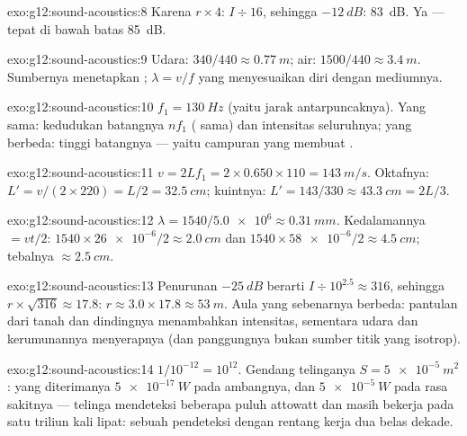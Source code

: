 \begin{solution}{exo:g12:sound-acoustics:8}
Karena $r \times 4$: $I \div 16$, sehingga $-\qty{12}{dB}$:
\qty{83}{dB}. Ya --- tepat di bawah batas \qty{85}{dB}.
\end{solution}

\begin{solution}{exo:g12:sound-acoustics:9}
Udara: $340/440 \approx \qty{0.77}{m}$; air:
$1500/440 \approx
\qty{3.4}{m}$. Sumbernya menetapkan ;
 $\lambda = v/f$ yang menyesuaikan diri dengan
mediumnya.
\end{solution}

\begin{solution}{exo:g12:sound-acoustics:10}
$f_1 = \qty{130}{Hz}$ (yaitu jarak antarpuncaknya). Yang sama:
kedudukan batangnya $nf_1$ ( sama) dan intensitas
seluruhnya; yang berbeda: tinggi batangnya --- yaitu campuran yang
membuat .
\end{solution}

\begin{solution}{exo:g12:sound-acoustics:11}
$v = 2Lf_1 = 2 \times 0.650 \times 110 = \qty{143}{m/s}$. Oktafnya:
$L' = v/(2 \times 220) = L/2 = \qty{32.5}{cm}$; kuintnya:
$L' = 143/330 \approx \qty{43.3}{cm} = 2L/3$.
\end{solution}

\begin{solution}{exo:g12:sound-acoustics:12}
$\lambda = 1540/\num{5.0e6} \approx \qty{0.31}{mm}$. Kedalamannya
$= vt/2$: $1540 \times \num{26e-6}/2 \approx \qty{2.0}{cm}$ dan
$1540 \times \num{58e-6}/2 \approx \qty{4.5}{cm}$; tebalnya
$\approx \qty{2.5}{cm}$.
\end{solution}

\begin{solution}{exo:g12:sound-acoustics:13}
Penurunan $-\qty{25}{dB}$ berarti $I \div 10^{2.5} \approx 316$,
sehingga $r \times \sqrt{316} \approx 17.8$:
$r \approx 3.0 \times 17.8
\approx \qty{53}{m}$. Aula yang sebenarnya
berbeda: pantulan dari tanah dan dindingnya menambahkan intensitas,
sementara udara dan kerumunannya menyerapnya (dan panggungnya bukan
sumber titik yang isotrop).
\end{solution}

\begin{solution}{exo:g12:sound-acoustics:14}
$1/10^{-12} = 10^{12}$. Gendang telinganya
$S = \qty{5e-5}{m^2}$:  yang diterimanya $\qty{5e-17}{W}$ pada
ambangnya, dan $\qty{5e-5}{W}$ pada rasa sakitnya --- telinga mendeteksi
beberapa puluh attowatt dan masih bekerja pada satu triliun kali lipat:
sebuah pendeteksi dengan rentang kerja dua belas dekade.
\end{solution}

